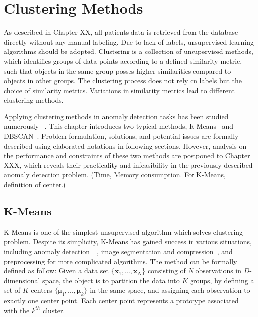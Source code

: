 \chapter{Clustering Methods}
\label{chapter:clustering}

As described in Chapter XX, all patients data is retrieved from the database directly without any manual labeling. Due to lack of labels, unsupervised learning algorithms should be adopted. Clustering is a collection of unsupervised methods, which identifies groups of data points according to a defined similarity metric, such that objects in the same group posses higher similarities compared to objects in other groups. The clustering process does not rely on labels but the choice of similarity metrics. Variations in similarity metrics lead to different clustering methods.

Applying clustering methods in anomaly detection tasks has been studied numerously~\cite{he2003discovering}
. This chapter introduces two typical methods, K-Means~\cite{lloyd1982least} and DBSCAN~\cite{ester1996density}. Problem formulation, solutions, and potential issues are formally described using elaborated notations in following sections. However, analysis on the performance and constraints of these two methods are postponed to Chapter XXX, which reveals their practicality and infeasibility in the previously described anomaly detection problem. (Time, Memory consumption. For K-Means, definition of center.)

\section{K-Means}
\label{sec:k-means}

K-Means is one of the simplest unsupervised algorithm which solves clustering problem. Despite its simplicity, K-Means has gained success in various situations, including anomaly detection~\cite{he2003discovering}~\cite{campello2015hierarchical}, image segmentation and compression~\cite{forsyth2002computer}, and preprocessing for more complicated algorithms. The method can be formally defined as follow: Given a data set $\{\mathbf{x}_1, ... , \mathbf{x}_N\}$ consisting of $N$ observations in $D$-dimensional space, the object is to partition the data into $K$ groups, by defining a set of $K$ centers $\{\boldsymbol{\mu}_1, ... , \boldsymbol{\mu}_k\}$ in the same space, and assigning each observation to exactly one center point. Each center point represents a prototype associated with the $k^{th}$ cluster.

